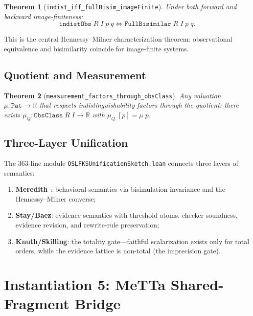 \documentclass[11pt]{article}
\newtheorem{theorem}{Theorem}[section]
\begin{document}
\begin{theorem}[\texttt{indist\_iff\_fullBisim\_imageFinite}]\label{thm:hm-iff}
Under both forward and backward image-finiteness:
\[
  \texttt{indistObs}\;R\;I\;p\;q \iff \texttt{FullBisimilar}\;R\;I\;p\;q.
\]
\end{theorem}

This is the central Hennessy--Milner characterization theorem:
observational equivalence and bisimilarity coincide for image-finite
systems.

\subsection{Quotient and Measurement}

\begin{theorem}[\texttt{measurement\_factors\_through\_obsClass}]\label{thm:factor}
Any valuation $\mu : \texttt{Pat} \to \mathbb{R}$ that respects
indistinguishability factors through the quotient:
there exists $\mu_Q : \texttt{ObsClass}\;R\;I \to \mathbb{R}$ with
$\mu_Q\;[p] = \mu\;p$.
\end{theorem}

\subsection{Three-Layer Unification}

The 363-line module \texttt{OSLFKSUnificationSketch.lean} connects three
layers of semantics:
\begin{enumerate}
\item \textbf{Meredith}~\cite{MeredithRadestock2005}: behavioral
  semantics via bisimulation invariance and the Hennessy--Milner
  converse;
\item \textbf{Stay/Baez}: evidence semantics with threshold atoms,
  checker soundness, evidence revision, and rewrite-rule preservation;
\item \textbf{Knuth/Skilling}: the totality gate---faithful
  scalarization exists only for total orders, while the evidence
  lattice is non-total (the imprecision gate).
\end{enumerate}


\section{Instantiation 5: MeTTa Shared-Fragment Bridge}\label{sec:metta-bridge}
\end{document}
